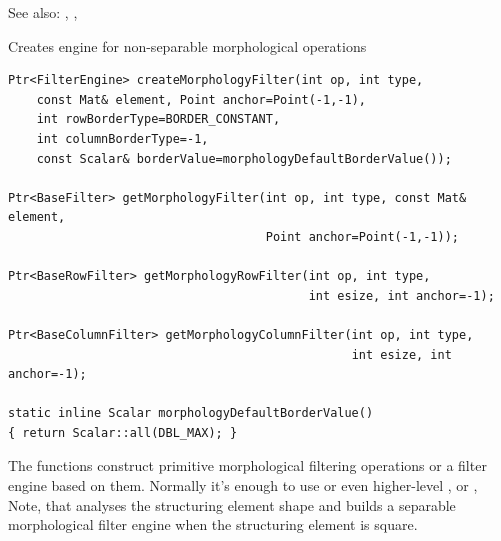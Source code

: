 See also: , , 

\label{createMorphologyFilter}
Creates engine for non-separable morphological operations

\begin{lstlisting}
Ptr<FilterEngine> createMorphologyFilter(int op, int type,
    const Mat& element, Point anchor=Point(-1,-1),
    int rowBorderType=BORDER_CONSTANT,
    int columnBorderType=-1,
    const Scalar& borderValue=morphologyDefaultBorderValue());
                   
Ptr<BaseFilter> getMorphologyFilter(int op, int type, const Mat& element,
                                    Point anchor=Point(-1,-1));
                                   
Ptr<BaseRowFilter> getMorphologyRowFilter(int op, int type,
                                          int esize, int anchor=-1);
                                          
Ptr<BaseColumnFilter> getMorphologyColumnFilter(int op, int type,
                                                int esize, int anchor=-1);

static inline Scalar morphologyDefaultBorderValue()
{ return Scalar::all(DBL_MAX); }
\end{lstlisting}
\begin{description}
\end{description}

The functions construct primitive morphological filtering operations or a filter engine based on them. Normally it's enough to use  or even higher-level ,  or , Note, that  analyses the structuring element shape and builds a separable morphological filter engine when the structuring element is square.

